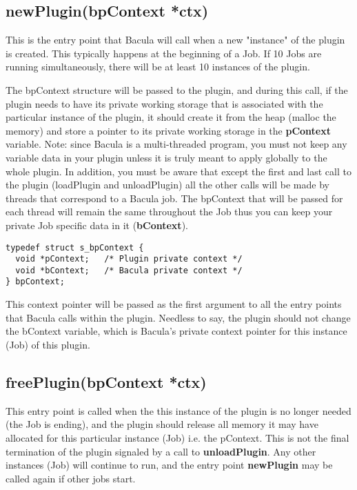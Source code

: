 \subsection{newPlugin(bpContext *ctx)}
  This is the entry point that Bacula will call
  when a new "instance" of the plugin is created. This typically
  happens at the beginning of a Job.  If 10 Jobs are running
  simultaneously, there will be at least 10 instances of the
  plugin.

  The bpContext structure will be passed to the plugin, and
  during this call, if the plugin needs to have its private
  working storage that is associated with the particular
  instance of the plugin, it should create it from the heap
  (malloc the memory) and store a pointer to
  its private working storage in the {\bf pContext} variable.
  Note: since Bacula is a multi-threaded program, you must not
  keep any variable data in your plugin unless it is truly meant
  to apply globally to the whole plugin.  In addition, you must
  be aware that except the first and last call to the plugin
  (loadPlugin and unloadPlugin) all the other calls will be 
  made by threads that correspond to a Bacula job.  The 
  bpContext that will be passed for each thread will remain the
  same throughout the Job thus you can keep your private Job specific
  data in it ({\bf bContext}).

\begin{verbatim}
typedef struct s_bpContext {
  void *pContext;   /* Plugin private context */
  void *bContext;   /* Bacula private context */
} bpContext;

\end{verbatim}
   
  This context pointer will be passed as the first argument to all
  the entry points that Bacula calls within the plugin.  Needless
  to say, the plugin should not change the bContext variable, which
  is Bacula's private context pointer for this instance (Job) of this
  plugin.

\subsection{freePlugin(bpContext *ctx)}
This entry point is called when the
this instance of the plugin is no longer needed (the Job is
ending), and the plugin should release all memory it may
have allocated for this particular instance (Job) i.e. the pContext.  
This is not the final termination
of the plugin signaled by a call to {\bf unloadPlugin}. 
Any other instances (Job) will
continue to run, and the entry point {\bf newPlugin} may be called
again if other jobs start.

